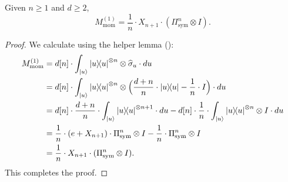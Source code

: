 \documentclass{article}
\begin{document}
\begin{lemma}\label{lem:first-moment-operator}
    Given $n \geq 1$ and $d \geq 2$,
    \begin{equation*}
        M_{\mathrm{mom}}^{(1)} = \frac{1}{n} \cdot X_{n+1} \cdot (\Pi_{\mathrm{sym}}^n \otimes I).
    \end{equation*}
\end{lemma}
\begin{proof}
    We calculate using the helper lemma ():
    \begin{align*}
        M_{\mathrm{mom}}^{(1)}
        & = d[n] \cdot \int_{\ket{u}} \ketbra{u}^{\otimes n} \otimes \widehat{\sigma}_{u} \cdot du\\
        & = d[n] \cdot \int_{\ket{u}} \ketbra{u}^{\otimes n} \otimes \Big(\frac{d+n}{n} \cdot \ketbra{u} - \frac{1}{n} \cdot I\Big) \cdot du\\
        & =d[n] \cdot\frac{d+n}{n} \cdot  \int_{\ket{u}} \ketbra{u}^{\otimes n + 1} \cdot du - d[n] \cdot\frac{1}{n} \cdot \int_{\ket{u}} \ketbra{u}^{\otimes n} \otimes I \cdot du\\
        & = \frac{1}{n}  \cdot (e + X_{n+1})\cdot \Pi_{\mathrm{sym}}^n \otimes I - \frac{1}{n} \cdot \Pi_{\mathrm{sym}}^n \otimes I\\
        & = \frac{1}{n} \cdot X_{n+1} \cdot (\Pi_{\mathrm{sym}}^n \otimes I).
    \end{align*}
    This completes the proof.
\end{proof}
\end{document}
